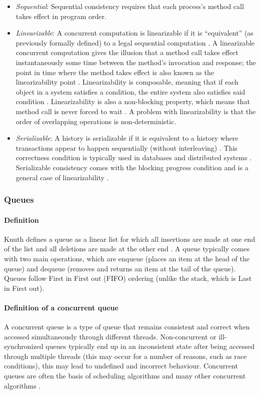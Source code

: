 \documentclass[a4paper, 12pt, titlepage]{article}
\begin{document}
\begin{singlespace}
\begin{itemize}
\item \emph{Sequential}: Sequential consistency requires that each process's method call takes effect in program order.
\item \emph{Linearizable}: A concurrent computation is linearizable if it is ``equivalent'' (as previously formally defined) to a legal sequential computation \cite{herlihy1990linearizability}. A linearizable concurrent computation gives the illusion that a method call takes effect instantaneously some time between the method's invocation and response; the point in time where the method takes effect is also known as the linearizability point \cite{herlihy2020art,herlihy1990linearizability}. Linearizability is composable, meaning that if each object in a system satisfies a condition, the entire system also satisfies said condition \cite[Chapter~3.3.1]{herlihy2020art}. Linearizability is also a non-blocking property, which means that method call is never forced to wait \cite{herlihy1990linearizability}. A problem with linearizability is that the order of overlapping operations is non-deterministic.
\item \emph{Serializable}: A history is serializable if it is equivalent to a history where transactions appear to happen sequentially (without interleaving) \cite[Section~3.3]{herlihy1990linearizability}. This correctness condition is typically used in databases and distributed systems \cite{guerraoui2019consensus}. Serializable consistency comes with the blocking progress condition and is a general case of linearizability \cite{herlihy1990linearizability}.
\end{itemize}
\subsubsection{Queues}
\paragraph{Definition}
Knuth defines a queue as a linear list for which all insertions are made at one end of the list and all deletions are made at the other end \cite{knuth1968art}. A queue typically comes with two main operations, which are enqueue (places an item at the head of the queue) and dequeue (removes and returns an item at the tail of the queue). Queues follow First in First out (FIFO) ordering (unlike the stack, which is Last in First out).
\paragraph{Definition of a concurrent queue}
A concurrent queue is a type of queue that remains consistent and correct when accessed simultaneously through different threads. Non-concurrent or ill-synchronized queues typically end up in an inconsistent state after being accessed through multiple threads (this may occur for a number of reasons, such as race conditions)\cite{yahav2003automatically}, this may lead to undefined and incorrect behaviour. Concurrent queues are often the basis of scheduling algorithms and many other concurrent algorithms \cite{yahav2003automatically}.

\end{singlespace}
\end{document}
